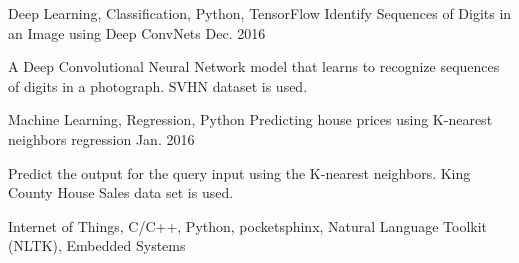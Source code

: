 \begin{cventries}
	\cventry
    {Deep Learning, Classification, Python, TensorFlow}
    {Identify Sequences of Digits in an Image using Deep ConvNets}
    {{}}
    {Dec. 2016}
    {
      \begin{cvitems}
        \item {A Deep Convolutional Neural Network model that learns to recognize sequences of digits in a photograph. SVHN dataset is used. }
      \end{cvitems}
    }
  \cventry
    {Machine Learning, Regression, Python}
    {Predicting house prices using K-nearest neighbors regression}
    {}
    {Jan. 2016}
    {
      \begin{cvitems}
        \item {Predict the output for the query input using the K-nearest neighbors. King County House Sales data set is used.}
      \end{cvitems}
    }
    \cventry
    {Internet of Things, C/C++, Python, pocketsphinx, Natural Language Toolkit (NLTK), Embedded Systems}

\end{cventries}
